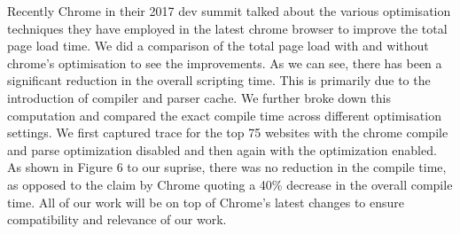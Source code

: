 Recently Chrome in their 2017 dev summit talked about the various
optimisation techniques they have employed in the latest chrome
browser to improve the total page load time.  We did a comparison of
the total page load with and without chrome's optimisation to see the
improvements. As we can see, there has been a significant reduction in
the overall scripting time. This is primarily due to the introduction
of compiler and parser cache.  We further broke down this computation
and compared the exact compile time across different optimisation
settings. We first captured trace for the top 75 websites with the
chrome compile and parse optimization disabled and then again with the
optimization enabled. As shown in Figure 6 to our suprise, there was
no reduction in the compile time, as opposed to the claim by Chrome
quoting a 40\% decrease in the overall compile time.  All of our work
will be on top of Chrome's latest changes to ensure compatibility and
relevance of our work. 
